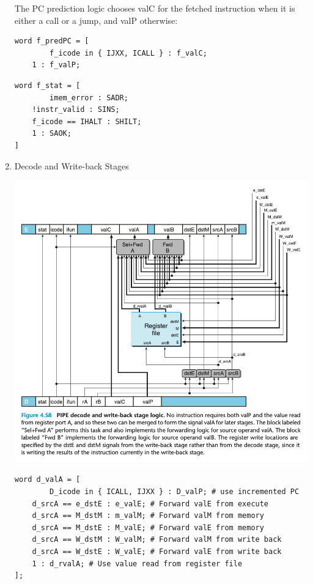 \documentclass[11pt]{article}
\begin{document}
\begin{enumerate}
The PC prediction logic chooses valC for the fetched instruction when it is either a call or a jump, and valP otherwise:\\
\begin{verbatim}
word f_predPC = [
        f_icode in { IJXX, ICALL } : f_valC;
	1 : f_valP;
\end{verbatim}

\begin{verbatim}
word f_stat = [
        imem_error : SADR;
	!instr_valid : SINS;
	f_icode == IHALT : SHILT;
	1 : SAOK;
]
\end{verbatim}

\item Decode and Write-back Stages
\label{sec:org87052a3}

\begin{center}
\includegraphics[width=.9\linewidth]{pics/figure4.58-pipe-decode-and-write-back-stage-logic.png}
\end{center}

\begin{verbatim}
word d_valA = [
        D_icode in { ICALL, IJXX } : D_valP; # use incremented PC
	d_srcA == e_dstE : e_valE; # Forward valE from execute
	d_srcA == M_dstM : m_valM; # Forward valM from memory
	d_srcA == M_dstE : M_valE; # Forward valE from memory
	d_srcA == W_dstM : W_valM; # Forward valM from write back
	d_srcA == W_dstE : W_valE; # Forward valE from write back
	1 : d_rvalA; # Use value read from register file
];
\end{verbatim}


\end{enumerate}
\end{document}
